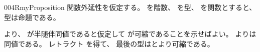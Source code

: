 \documentclass[index]{subfiles}
\begin{document}
\begin{myBlock}{004R}{myProposition}
  関数外延性を仮定する。
  を階数、
  を型、
  を関数とすると、
  型は命題である。
\end{myBlock}
\StartDefiningTabulars
\begin{myProof}
  より、
  が半随伴同値であると仮定して
  が可縮であることを示せばよい。
  よりは同値である。
  レトラクト
  を得て、
  最後の型はとより可縮である。
\end{myProof}
\StopDefiningTabulars
\end{document}
